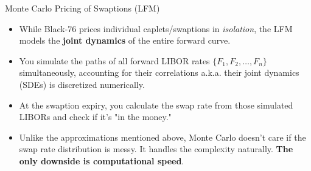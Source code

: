 \documentclass{beamer}
\begin{document}
\begin{frame}{Monte Carlo Pricing of Swaptions (LFM)}
	\begin{itemize}
		\item While Black-76 prices individual caplets/swaptions in \emph{isolation}, the LFM models the \textbf{joint dynamics} of the entire forward curve.
		\item You simulate the paths of all forward LIBOR rates $\{F_1, F_2, \ldots, F_n\}$ simultaneously, accounting for their correlations a.k.a.  their joint dynamics (SDEs) is discretized numerically.
		\item At the swaption expiry, you calculate the swap rate from those simulated LIBORs and check if it's "in the money."
		\item Unlike the approximations mentioned above, Monte Carlo doesn't care if the swap rate distribution is messy. It handles the complexity naturally. \textbf{The only downside is computational speed}.
		
	\end{itemize}
\end{frame}
\end{document}
